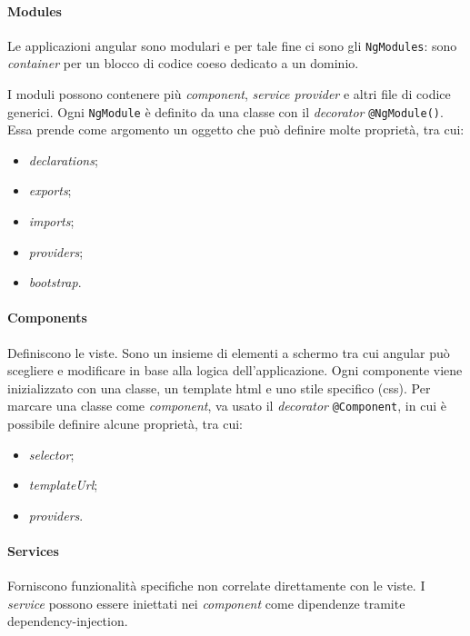 \paragraph*{Modules}
Le applicazioni \gls{angular} sono modulari e per tale fine ci sono gli \texttt{NgModules}: sono \textit{container} per un blocco di codice coeso dedicato a un dominio.

I moduli possono contenere più \textit{component}, \textit{service provider} e altri file di codice generici. Ogni \texttt{NgModule} è definito da una classe con il \textit{decorator} \texttt{@NgModule()}. Essa prende come argomento un oggetto che può definire molte proprietà, tra cui:
\begin{itemize}
	\item \textit{declarations};
	\item \textit{exports};
	\item \textit{imports};
	\item \textit{providers};
	\item \textit{bootstrap}.
\end{itemize}

\paragraph*{Components}
Definiscono le viste. Sono un insieme di elementi a schermo tra cui \gls{angular} può scegliere e modificare in base alla logica dell'applicazione.
Ogni componente viene inizializzato con una classe, un template \acrshort{html} e uno stile specifico (\acrshort{css}).
Per marcare una classe come \textit{component}, va usato il \textit{decorator} \texttt{@Component}, in cui è possibile definire alcune proprietà, tra cui:
\begin{itemize}
	\item \textit{selector};
	\item \textit{templateUrl};
	\item \textit{providers}.
\end{itemize}

\paragraph*{Services}
Forniscono funzionalità specifiche non correlate direttamente con le viste. I \textit{service} possono essere iniettati nei \textit{component} come dipendenze tramite \gls{dependency-injection}.


